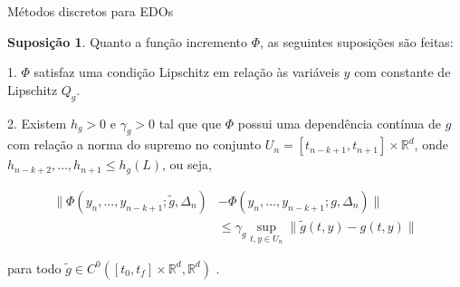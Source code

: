 \documentclass{beamer}
\newcommand{\R}{\mathbb{R}}
\theoremstyle{plain}
\theoremstyle{definition}
\newtheorem{assumption}{Suposição}
\begin{document}

\begin{frame}{Métodos discretos para EDOs}
    \begin{assumption}
        \label{chap3:assumption:1:Phi}
        \small
        Quanto a função incremento $\Phi$, as seguintes suposições são feitas:

        \phantom{aa} 1. $\Phi$ satisfaz uma condição Lipschitz em relação às variáveis $y$ com constante de Lipschitz $Q_g$.


        \phantom{aa} 2. Existem $h_g>0$ e $\gamma_g > 0$  tal que que $\Phi$ possui uma dependência contínua de $g$ com relação a norma do supremo no conjunto $U_n = [t_{n-k+1}, t_{n+1}] \times \R^d$, onde $h_{n - k +2 }, \dots, h_{n+1} \leq h_g (L)$, ou seja, 

        \scriptsize
            \begin{equation}
                \begin{split}
                    \| \Phi(y_n, ..., y_{n - k + 1}; \tilde{g}, \Delta_n)  &- \Phi(y_n, ..., y_{n - k + 1}; g, \Delta_n) \| \\
                                                                           &\leq \gamma_g \sup_{t, y \in U_n} \| \tilde{g}(t, y) - g(t, y) \|
                \end{split}
                \label{chap3:assumption:point_lipschitz}
            \end{equation}

        para todo $\tilde{g} \in C^0([t_0, t_f] \times \R^d, \R^d)$ . 

    \end{assumption}

\end{frame}



\end{document}
